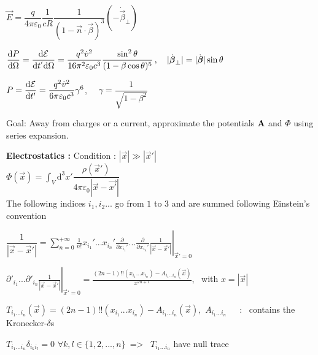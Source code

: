 \squishlist
\item $\vec{E} = \dfrac{q}{4\pi\varepsilon_0}\dfrac{1}{cR}\dfrac{1}{(1-\vec{n}\cdot\vec{\beta})^3}(-\dot{\vec{\beta}}_{\perp})$

\item $\dfrac{\ud P}{\ud \Omega} = \dfrac{\ud \E}{\ud t^{'}\ud \Omega} = \dfrac{q^2 \dot{v}^2}{16\pi^2\varepsilon_0c^3}\dfrac{\sin^2\theta}{(1-\beta\cos\theta)^5} \, , \quad |\dot{\vec{\beta}}_{\perp}| = |\dot{\vec{\beta}}|\sin\theta$

\item $P = \dfrac{\ud \E}{\ud t'} = \dfrac{q^2 \dot{v}^2}{6 \pi \varepsilon_0 c^3} \gamma^6$, $\quad \gamma = \dfrac{1}{\sqrt{1-\beta^2}}$
\squishend

Goal: Away from charges or a current, approximate the potentials $\vec{\rm{A}}$ and $\Phi$ using series expansion.


\squishlist
\item \textbf{Electrostatics :} Condition : $|\vec{x}| \gg |\vec{x}'|$
\\

$\Phi(\vec{x}) = \displaystyle{\int_V} \text{d}^3 x' \dfrac{\rho(\vec{x}')}{4\pi\varepsilon_0|\vec{x}-\vec{x'}|}$ \\
The following indices $i_1,i_2...$ go from $1$ to $3$ and are summed following Einstein's convention

\item  $\dfrac{1}{|\vec{x} - \vec{x}'|} = \left. \sum_{n=0}^{+\infty} \frac{1}{n!} x_{i_1}'...x_{i_n}' \frac{\partial}{\partial x_{i_1}'}... \frac{\partial}{\partial x_{i_n}'} \frac{1}{|\vec{x} - \vec{x}'|} \right|_{\vec{x}' = 0}$

\item $\left. \partial'_{i_1}...\partial'_{i_n} \frac{1}{|\vec{x} - \vec{x}'|}\right|_{\vec{x}' = 0} = \frac{(2n-1)!! (x_{i_1}...x_{i_n}) - A_{i_1 ... i_n} (\vec{x})}{x^{2n+1}}$, \, with $x=|\vec{x}|$

\item $T_{i_1 ... i_n}(\vec{x}) = (2n-1)!! (x_{i_1} ... x_{i_n}) - A_{i_1 ... i_n} (\vec{x}), \, \,  A_{i_1...i_n} \, \quad $ : \, contains the Kronecker-$\delta$s

\item $T_{i_1...i_n} \delta_{i_k i_l} = 0 \,\, \forall k,l \in \{1,2,...,n\} \, $ => \, $T_{i_1...i_n}$ have null trace

